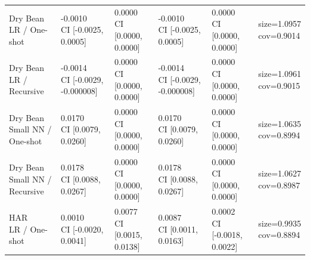\begin{table}[t]
\begin{tabular}{llllll}
\shortstack{Dry Bean\\LR / One-shot} & \shortstack{-0.0010\\CI [-0.0025, 0.0005]} & \shortstack{0.0000\\CI [0.0000, 0.0000]} & \shortstack{-0.0010\\CI [-0.0025, 0.0005]} & \shortstack{0.0000\\CI [0.0000, 0.0000]} & \shortstack{size=1.0957\\cov=0.9014} \\
\shortstack{Dry Bean\\LR / Recursive} & \shortstack{-0.0014\\CI [-0.0029, -0.000008]} & \shortstack{0.0000\\CI [0.0000, 0.0000]} & \shortstack{-0.0014\\CI [-0.0029, -0.000008]} & \shortstack{0.0000\\CI [0.0000, 0.0000]} & \shortstack{size=1.0961\\cov=0.9015} \\
\shortstack{Dry Bean\\Small NN / One-shot} & \shortstack{0.0170\\CI [0.0079, 0.0260]} & \shortstack{0.0000\\CI [0.0000, 0.0000]} & \shortstack{0.0170\\CI [0.0079, 0.0260]} & \shortstack{0.0000\\CI [0.0000, 0.0000]} & \shortstack{size=1.0635\\cov=0.8994} \\
\shortstack{Dry Bean\\Small NN / Recursive} & \shortstack{0.0178\\CI [0.0088, 0.0267]} & \shortstack{0.0000\\CI [0.0000, 0.0000]} & \shortstack{0.0178\\CI [0.0088, 0.0267]} & \shortstack{0.0000\\CI [0.0000, 0.0000]} & \shortstack{size=1.0627\\cov=0.8987} \\
\shortstack{HAR\\LR / One-shot} & \shortstack{0.0010\\CI [-0.0020, 0.0041]} & \shortstack{0.0077\\CI [0.0015, 0.0138]} & \shortstack{0.0087\\CI [0.0011, 0.0163]} & \shortstack{0.0002\\CI [-0.0018, 0.0022]} & \shortstack{size=0.9935\\cov=0.8894} \\

\end{tabular}
\end{table}
